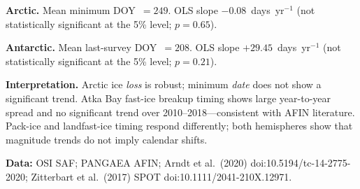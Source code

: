 \documentclass[10pt,a4paper]{article}
\begin{document}
\textbf{Arctic.} Mean minimum DOY~$=249$. OLS slope $-0.08$~days~yr$^{-1}$ (not statistically significant at the 5\% level; $p=0.65$).

\textbf{Antarctic.} Mean last-survey DOY~$=208$. OLS slope $+29.45$~days~yr$^{-1}$ (not statistically significant at the 5\% level; $p=0.21$).

\textbf{Interpretation.} Arctic ice \emph{loss} is robust; minimum \emph{date} does not show a significant trend. Atka Bay fast-ice breakup timing shows large year-to-year spread and no significant trend over 2010--2018---consistent with AFIN literature. Pack-ice and landfast-ice timing respond differently; both hemispheres show that magnitude trends do not imply calendar shifts.

\small
\textbf{Data:} OSI SAF; PANGAEA AFIN; Arndt et al.\ (2020) doi:10.5194/tc-14-2775-2020; Zitterbart et al.\ (2017) SPOT doi:10.1111/2041-210X.12971.
\end{document}
